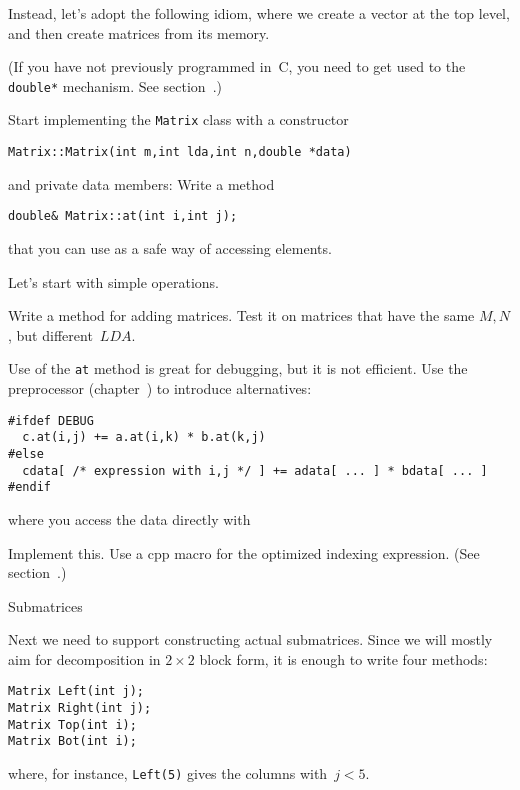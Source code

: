 Instead,
let's adopt the following idiom, where we create a vector at the top
level, and then create matrices from its memory.
%

(If you have not previously programmed in~C, you need to get used to
the \lstinline{double*} mechanism. 
See section~.)

\begin{exercise}
  Start implementing the \lstinline{Matrix} class with a constructor
\begin{lstlisting}
Matrix::Matrix(int m,int lda,int n,double *data)
\end{lstlisting}
and private data members:
%
%
Write a method
\begin{lstlisting}
double& Matrix::at(int i,int j);  
\end{lstlisting}
that you can use as a safe way of accessing elements.
\end{exercise}

Let's start with simple operations.
\begin{exercise}
  Write a method for adding matrices. Test it on matrices that have
  the same $M,N$, but different~$\mathord{LDA}$.
\end{exercise}

Use of the \lstinline{at} method is great for debugging, but it is not
efficient. Use the preprocessor (chapter~) to introduce
alternatives:
\begin{lstlisting}
#ifdef DEBUG
  c.at(i,j) += a.at(i,k) * b.at(k,j)
#else
  cdata[ /* expression with i,j */ ] += adata[ ... ] * bdata[ ... ]
#endif
\end{lstlisting}
where you access the data directly with
%

\begin{exercise}
  Implement this. Use a cpp  macro for the
  optimized indexing expression. (See section~.)
\end{exercise}

 {Submatrices}

Next we need to support constructing actual submatrices. Since we will
mostly aim for decomposition in $2\times2$ block form, it is enough to
write four methods:
\begin{lstlisting}
Matrix Left(int j);
Matrix Right(int j);
Matrix Top(int i);
Matrix Bot(int i);
\end{lstlisting}
where, for instance, \lstinline{Left(5)} gives the columns with~$j<5$.


